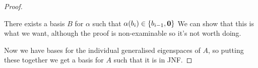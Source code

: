 \documentclass[../Main.tex]{subfiles}
\begin{document}
\begin{proof}
\begin{subproof}{There exists a basis $B$ for $\alpha$ such that $\alpha(b_i) \in \{b_{i-1}, \boldsymbol{0}\}$}
{            We can show that this is what we want, although the proof is non-examinable so it's not worth doing.
        }
    \end{subproof}
    Now we have bases for the individual generalised eigenspaces of $A$, so putting these together we get a basis for $A$ such that it is in JNF.
\end{proof}
\end{document}
